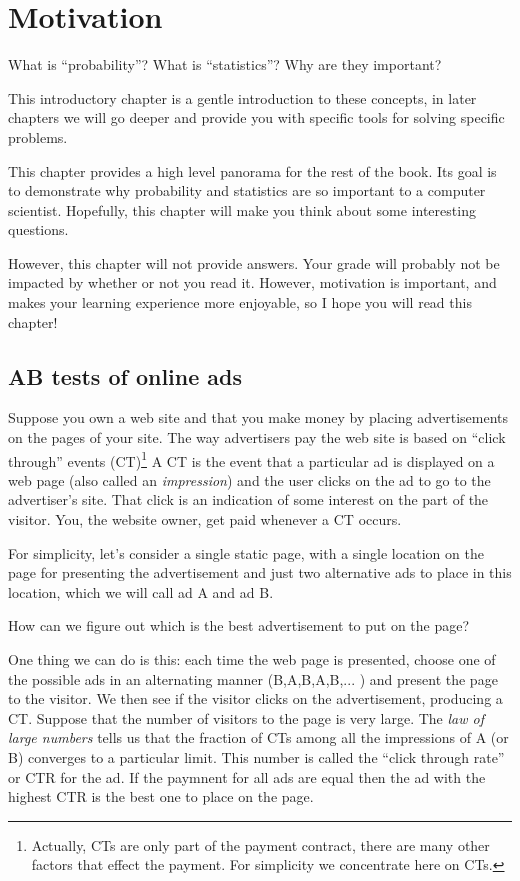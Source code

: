 \chapter{Motivation}

What is ``probability''? What is ``statistics''? Why are they
important?

This introductory chapter is a gentle introduction to these concepts,
in later chapters we will go deeper and provide you with specific
tools for solving specific problems.

This chapter provides a high level panorama for the rest of the
book. Its goal is to demonstrate why probability and statistics are so
important to a computer scientist. Hopefully, this chapter will make
you think about some interesting questions.

However, this chapter will not provide answers. Your grade will
probably not be impacted by whether or not you read it. However,
motivation is important, and makes your learning experience more
enjoyable, so I hope you will read this chapter!

\section{AB tests of online ads}

Suppose you own a web site and that you make money by placing
advertisements on the pages of your site. The way advertisers pay the web
site is based on ``click through'' events (CT)\footnote{Actually, CTs are
  only part of the payment contract, there are many other factors that effect
  the payment. For simplicity we concentrate here on CTs.} 
A CT is the event that a particular ad is displayed on a
web page (also called an {\em impression}) and the user clicks on the
ad to go to the advertiser's site. That click is an indication of some
interest on the part of the visitor. You, the website owner, get
paid whenever a CT occurs.

For simplicity, let's consider a single static page, with a single
location on the page for presenting the advertisement and just two
alternative ads to place in this location, which we will call ad A and
ad B. 

How can we figure out which is the best advertisement to put on the
page?

One thing we can do is this: each time the web page is presented,
choose one of the possible ads in an alternating manner
(B,A,B,A,B,... ) and present the page to the visitor. We then see if
the visitor clicks on the advertisement, producing a CT. Suppose that
the number of visitors to the page is very large. The {\em law of
  large numbers} tells us that the fraction of CTs among all the
impressions of A (or B) converges to a particular limit.  This number
is called the ``click through rate'' or CTR for the ad. If the
paymnent for all ads are equal then the ad with the highest CTR is the
best one to place on the page.

